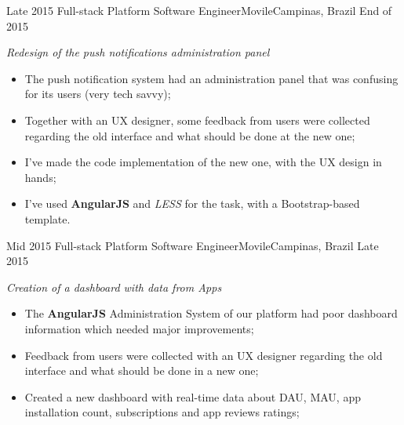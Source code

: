 \begin{experiences}
{\begin{itemize}
          \end{itemize}
        }{}
  \experience
  {Late 2015} {Full-stack Platform Software Engineer}{Movile}{Campinas, Brazil}
  {End of 2015}
        {
        \emph{Redesign of the push notifications administration panel}\\
          \begin{itemize}
            \item The push notification system had an administration panel that was confusing for its users (very tech savvy);
            \item Together with an UX designer, some feedback from users were collected regarding the old interface and what should
            be done at the new one;
            \item I've made the code implementation of the new one, with the UX design in hands;
            \item I've used \textbf{AngularJS} and \emph{LESS} for the task, with a Bootstrap-based template.\\
          \end{itemize}
        }{}
  \experience
  {Mid 2015} {Full-stack Platform Software Engineer}{Movile}{Campinas, Brazil}
  {Late 2015}
        {
        \emph{Creation of a dashboard with data from Apps}\\
          \begin{itemize}
            \item The \textbf{AngularJS} Administration System of our platform had poor dashboard information which needed major improvements;
            \item Feedback from users were collected with an UX designer regarding the old interface and what should be done in a new one;
            \item Created a new dashboard with real-time data about DAU, MAU, app installation count, subscriptions and app reviews ratings;
          \end{itemize}
        }{}
\end{experiences}
